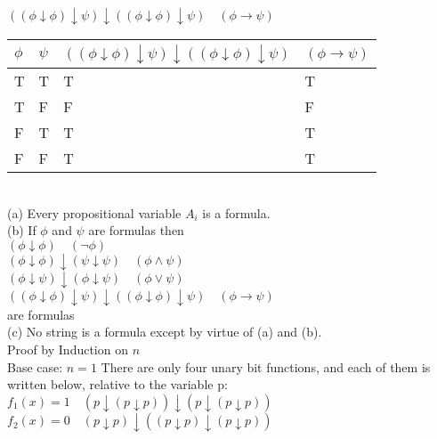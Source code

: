 \documentclass[10pt]{article}
\begin{document}
$((\phi\downarrow\phi)\downarrow\psi)\downarrow((\phi\downarrow\phi)\downarrow\psi)\quad (\phi\rightarrow\psi)$\\
\begin{table}[h]
    \begin{tabular}{|l|l|l|l|}
    \hline
    $\phi$ & $\psi$ & $((\phi\downarrow\phi)\downarrow\psi)\downarrow((\phi\downarrow\phi)\downarrow\psi)$ & $(\phi\rightarrow\psi)$ \\ \hline
    T      & T      & T                                                                                    & T                       \\ \hline
    T      & F      & F                                                                                    & F                       \\ \hline
    F      & T      & T                                                                                    & T                       \\ \hline
    F      & F      & T                                                                                    & T                       \\ \hline
    \end{tabular}
    \end{table}\\
(a) Every propositional variable $A_i$ is a formula.\\
(b) If $\phi$ and $\psi$ are formulas then\\
$(\phi\downarrow\phi)\quad (\lnot\phi)$\\
$(\phi\downarrow\phi)\downarrow(\psi\downarrow\psi)\quad(\phi\land\psi)$\\
$(\phi\downarrow\psi)\downarrow(\phi\downarrow\psi)\quad(\phi\lor\psi)$\\
$((\phi\downarrow\phi)\downarrow\psi)\downarrow((\phi\downarrow\phi)\downarrow\psi)\quad (\phi\rightarrow\psi)$\\
are formulas\\
(c) No string is a formula except by virtue of (a) and (b).\\
Proof by Induction on $n$\\
Base case: $n=1$ There are only four unary bit functions, and each of them is written below, relative to the variable p:\\
$f_1(x)=1\quad (p\downarrow(p\downarrow p))\downarrow(p\downarrow(p\downarrow p))$\\
$f_2(x)=0\quad (p\downarrow p)\downarrow((p\downarrow p)\downarrow(p\downarrow p))$\\
\end{document}
